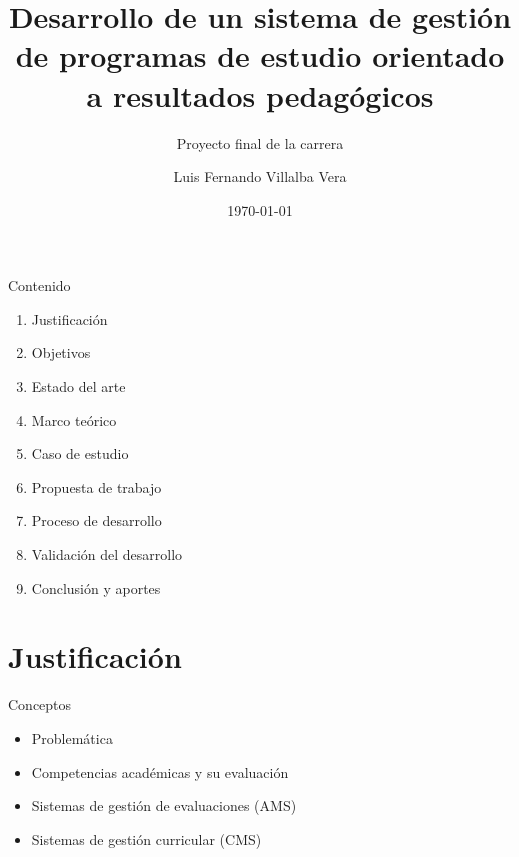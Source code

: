 \documentclass[10pt,xcolor=table ]{beamer}
\title{Desarrollo de un sistema de gestión de programas de estudio orientado a resultados pedagógicos}
\subtitle{Proyecto final de la carrera}
\author{Luis Fernando Villalba Vera}
\institute{Universidad Católica - Nuestra Señora de la Asunción}
\date{\today}
\begin{document}
\maketitle

\begin{frame}{Contenido}
	\begin{enumerate}
	    \item Justificación
	    \item Objetivos
	    \item Estado del arte
	    \item Marco teórico
	    \item Caso de estudio
	    \item Propuesta de trabajo
	    \item Proceso de desarrollo
	    \item Validación del desarrollo
	    \item Conclusión y aportes
	 \end{enumerate}
\end{frame}

\section{Justificación}
\begin{frame}{Conceptos}
  \begin{itemize}[<+- | alert@+>]
    \item Problemática
    \item Competencias académicas y su evaluación
    \item Sistemas de gestión de evaluaciones (AMS)
    \item Sistemas de gestión curricular (CMS)
  \end{itemize}
\end{frame}
\end{document}
